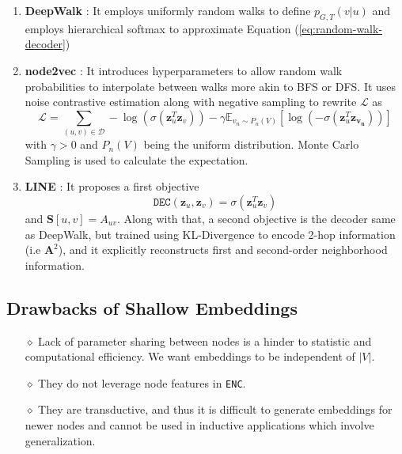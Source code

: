 \begin{enumerate}
\begin{enumerate}
	\item \textbf{DeepWalk} \cite{deepwalk}: 
	It employs uniformly random walks to define $p_{G,T}(v|u)$ and employs hierarchical softmax \cite{hierarchical-softmax} to approximate Equation (\ref{eq:random-walk-decoder})
	\item \textbf{node2vec} \cite{node2vec}: It introduces hyperparameters to allow random walk probabilities to interpolate between walks more akin to BFS or DFS. It uses noise contrastive estimation along with negative sampling to rewrite $\mathcal{L}$ as
	\begin{equation}
	\mathcal{L} = \sum_{(u,v)\in\mathcal{D}} -\log(\sigma(\mathbf{z}_u^T\mathbf{z}_v)) - \gamma \mathbb{E}_{v_n \sim P_n(V)}[\log(-\sigma(\mathbf{z}_u^T \mathbf{z_{v_n}}))]
	\end{equation}
	with $\gamma > 0$ and $P_n(V)$ being the uniform distribution. Monte Carlo Sampling is used to calculate the expectation.
	\item \textbf{LINE} \cite{line}: It proposes a first objective
	\begin{equation}
		\texttt{DEC}(\mathbf{z}_u, \mathbf{z}_v) = \sigma(\mathbf{z}_u^T\mathbf{z}_v)
	\end{equation}
and $\mathbf{S}[u,v] = A_{uv}$. Along with that, a second objective is the decoder same as DeepWalk, but trained using KL-Divergence to encode 2-hop information (i.e $\mathbf{A}^2$), and it explicitly reconstructs first and second-order neighborhood information.
\end{enumerate}
\end{enumerate}
\subsection{Drawbacks of Shallow Embeddings}
\begin{itemize}
	\item[$\diamond$] Lack of parameter sharing between nodes is a hinder to statistic and computational efficiency. We want embeddings to be independent of $|V|$.
	\item[$\diamond$] They do not leverage node features in \texttt{ENC}.
	\item[$\diamond$] They are transductive, and thus it is difficult to generate embeddings for newer nodes and cannot be used in inductive applications which involve generalization.
\end{itemize}
